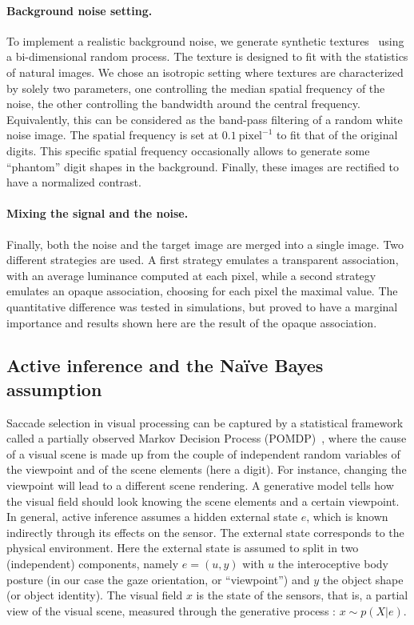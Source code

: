 \paragraph{Background noise setting.} To implement a realistic background noise, we generate synthetic textures~\cite{Sanz12} using a bi-dimensional random process. The texture is designed to fit with the statistics of natural images. We chose an isotropic setting where textures are characterized by solely two parameters, one controlling the median spatial frequency of the noise, the other controlling the bandwidth around the central frequency. Equivalently, this can be considered as the band-pass filtering of a random white noise image. The spatial frequency is set at $0.1~\text{pixel}^{-1}$ to fit that of the original digits. This specific spatial frequency occasionally allows to generate some ``phantom'' digit shapes in the background. Finally, these images are rectified to have a normalized contrast.

\paragraph{Mixing the signal and the noise.} Finally, both the noise and the target image are merged into a single image. Two different strategies are used. A first strategy emulates a transparent association, with an average luminance computed at each pixel, while a second strategy emulates an opaque association, choosing for each pixel the maximal value. The quantitative difference was tested in simulations, but proved to have a marginal importance and results shown here are the result of the opaque association.

\subsection{Active inference and the Naïve Bayes assumption}
Saccade selection in visual processing can be captured by a statistical framework called a
partially observed Markov Decision Process (POMDP)~\cite{Najemnik05,Butko2010infomax,Friston12}, where the cause of a visual scene is  made up from the couple of independent random variables of the viewpoint and of the scene elements (here a digit). For instance, changing the viewpoint will lead to a different scene rendering. A generative model tells how the visual field should look knowing the scene elements and a certain viewpoint. In general, active inference assumes a hidden external state $e$, which is known indirectly through its effects on the sensor. The external state corresponds to the physical environment. Here the external state is assumed to split in two (independent) components, namely $e = (u,y)$ with $u$ the interoceptive body posture (in our case the gaze orientation, or ``viewpoint'') and $y$ the object shape (or object identity). The visual field $x$ is the state of the sensors, that is, a partial view of the visual scene, measured through the generative process : $x\sim p(X|e)$.

